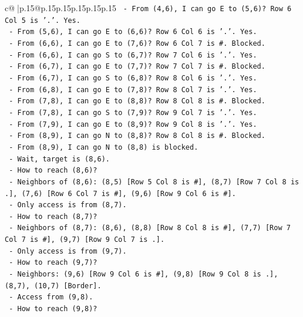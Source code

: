 \documentclass{article}
\begin{document}
{\begin{supertabular}{c@{$\;$}|p{.15\linewidth}@{}p{.15\linewidth}p{.15\linewidth}p{.15\linewidth}p{.15\linewidth}p{.15\linewidth}}
{{{\texttt{     {-} From (4,6), I can go E to (5,6)? Row 6 Col 5 is '.'. Yes.} \\
\texttt{     {-} From (5,6), I can go E to (6,6)? Row 6 Col 6 is '.'. Yes.} \\
\texttt{     {-} From (6,6), I can go E to (7,6)? Row 6 Col 7 is \#. Blocked.} \\
\texttt{     {-} From (6,6), I can go S to (6,7)? Row 7 Col 6 is '.'. Yes.} \\
\texttt{     {-} From (6,7), I can go E to (7,7)? Row 7 Col 7 is \#. Blocked.} \\
\texttt{     {-} From (6,7), I can go S to (6,8)? Row 8 Col 6 is '.'. Yes.} \\
\texttt{     {-} From (6,8), I can go E to (7,8)? Row 8 Col 7 is '.'. Yes.} \\
\texttt{     {-} From (7,8), I can go E to (8,8)? Row 8 Col 8 is \#. Blocked.} \\
\texttt{     {-} From (7,8), I can go S to (7,9)? Row 9 Col 7 is '.'. Yes.} \\
\texttt{     {-} From (7,9), I can go E to (8,9)? Row 9 Col 8 is '.'. Yes.} \\
\texttt{     {-} From (8,9), I can go N to (8,8)? Row 8 Col 8 is \#. Blocked.} \\
\texttt{     {-} From (8,9), I can go N to (8,8) is blocked.} \\
\texttt{     {-} Wait, target is (8,6).} \\
\texttt{     {-} How to reach (8,6)?} \\
\texttt{       {-} Neighbors of (8,6): (8,5) {[}Row 5 Col 8 is \#{]}, (8,7) {[}Row 7 Col 8 is .{]}, (7,6) {[}Row 6 Col 7 is \#{]}, (9,6) {[}Row 9 Col 6 is \#{]}.} \\
\texttt{       {-} Only access is from (8,7).} \\
\texttt{       {-} How to reach (8,7)?} \\
\texttt{         {-} Neighbors of (8,7): (8,6), (8,8) {[}Row 8 Col 8 is \#{]}, (7,7) {[}Row 7 Col 7 is \#{]}, (9,7) {[}Row 9 Col 7 is .{]}.} \\
\texttt{         {-} Only access is from (9,7).} \\
\texttt{       {-} How to reach (9,7)?} \\
\texttt{         {-} Neighbors: (9,6) {[}Row 9 Col 6 is \#{]}, (9,8) {[}Row 9 Col 8 is .{]}, (8,7), (10,7) {[}Border{]}.} \\
\texttt{         {-} Access from (9,8).} \\
\texttt{       {-} How to reach (9,8)?} \\
}}}
\end{supertabular}}
\end{document}
